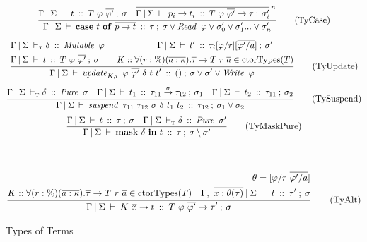 \begin{figure}[ht!]
\begin{gather*}
{		}
\\[1ex]
	\ruleI	{TyCase}
		{ \tyJudgeGS	{t}
				{T \ \varphi \ \ov{\varphi'}}
				{\sigma}
		  \quad
		  \ov{\tyJudgeGS	
				{p_i \to t_i}
				{T \ \varphi \ \ov{\varphi'} \to \tau}
				{\sigma_i'}}^{\: n}
		}	
		{ \tyJudgeGS	{ \kcase \ t \ \kof \ \ov{p \to t}}
				{\tau}
				{\sigma \lor \iRead \ \varphi 
					\lor \sigma_0' \lor \sigma_1' ... \lor \sigma_n'}
		}
\\[1ex]
	\ruleI	{TyUpdate}
		{ \begin{aligned}
			& \kiJudgeGS	{\delta}{\iMutable \ \varphi}
			  \hspace{6em} 
			  \tyJudgeGS	{t'}{\tau_i[\varphi/r][\ov{\varphi'/a}]}{\sigma'} \\
			& \tyJudgeGS	{t}{T \ \varphi \ \ov{\varphi'}}{\sigma}
			  \qq
		  	  K :: \forall(r : \%)(\ov{a : \kappa}). \ov{\tau} \to T \ r \ \ov{a} 
			 			\in \trm{ctorTypes}(T)
		  \end{aligned}
		}
		{ \tyJudgeGS	{\iupdate_{K,i} \ \varphi \ \ov{\varphi'} \ \delta \ t \ t'}
				{()}
				{\sigma \lor \sigma' \lor \iWrite \ \varphi}
		}
\\[1ex]
	\ruleI	{TySuspend}	
		{ 	\kiJudgeGS	{\delta}{\iPure \ \sigma} 
			\quad
			\tyJudgeGS	{t_1}
					{\tau_{11} \toa{\sigma} \tau_{12}}
					{\sigma_1}
			\quad
			\tyJudgeGS	{t_2}
					{\tau_{11}}
					{\sigma_2}
		}
		{
			\tyJudgeGS	{\isuspend \ \tau_{11} \ \tau_{12} \ \sigma \ \delta \ t_1 \ t_2}
					{\tau_{12}}
					{\sigma_1 \lor \sigma_2}
		}
\\[0.5ex]
	\frac	{	\tyJudgeGS	{t}{\tau}{\sigma}
			\quad
			\kiJudgeGS	{\delta}{\iPure \ \sigma'}
		}
		{	\tyJudgeGS	{\kmask \ \delta \ \kin \ t}{\tau}{\sigma \setminus \sigma' } }
		\tag{TyMaskPure}
\end{gather*}

\begin{center}
 \\
\end{center}
\vspace{-2em}
\begin{gather*}
	\ruleI	{TyAlt}
		{ 	\begin{aligned}
			\theta = [\varphi / r \ \ov{\varphi' / a}]
			\\
			K :: \forall (r : \%) (\ov{a : \kappa}). \ov{\tau} \to T \ r \ \ov{a} \in \trm{ctorTypes}(T)
			\quad
			\tyJudge	{\Gamma, \ \ov{x : \theta(\tau)}}
					{\Sigma}
					{t}
					{\tau'}
					{\sigma}
			\end{aligned}
		}
		{ \tyJudgeGS	{ K \ \ov{x} \to t}
				{ T \ \varphi \ \ov{\varphi'} \to \tau'}
				{ \sigma }
		}
\end{gather*}
\caption{Types of Terms}
\label{fig:types-of-terms}
\end{figure}